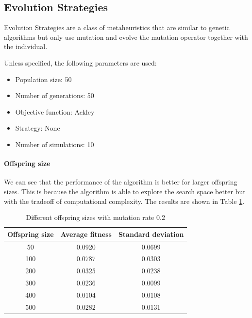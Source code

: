 \subsection{Evolution Strategies}
Evolution Strategies are a class of metaheuristics that are similar to genetic algorithms but only use mutation and evolve the mutation operator together with the individual.

Unless specified, the following parameters are used:
\begin{itemize}
    \item Population size: 50
    \item Number of generations: 50
    \item Objective function: Ackley
    \item Strategy: None
    \item Number of simulations: 10
\end{itemize}

\paragraph*{Offspring size}
We can see that the performance of the algorithm is better for larger offspring sizes. This is because the algorithm is able to explore the search space better but with the tradeoff of computational complexity. The results are shown in Table \ref{tab:es-offspring_size}.
\begin{table}[H]
    \centering
    \begin{tabular}{|c|c|c|}
        Offspring size & Average fitness & Standard deviation \\ \hline
        50             & 0.0920          & 0.0699             \\
        100            & 0.0787          & 0.0303             \\
        200            & 0.0325          & 0.0238             \\
        300            & 0.0236          & 0.0099             \\
        400            & 0.0104          & 0.0108             \\
        500            & 0.0282          & 0.0131             \\
    \end{tabular}
    \caption{Different offspring sizes with mutation rate 0.2}
    \label{tab:es-offspring_size}
\end{table}

